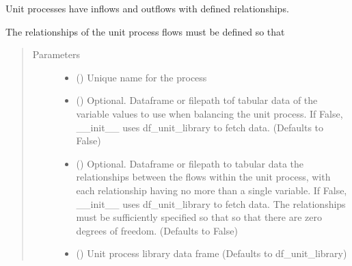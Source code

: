 \documentclass[a4paper,10pt,english]{sphinxmanual}
\begin{document}
\begin{fulllineitems}
\label{\detokenize{unit:unitprocess.UnitProcess}}
Unit processes have inflows and outflows with defined relationships.

The relationships of the unit process flows must be defined so that
\begin{quote}\begin{description}
\item[{Parameters}] \leavevmode\begin{itemize}
\item {} 
 () \textendash{} Unique name for the process

\item {} 
 () \textendash{} Optional. Dataframe or filepath tof
tabular data of the variable values to use when balancing the
unit process. If False, \_\_init\_\_ uses df\_unit\_library to fetch
data.
(Defaults to False)

\item {} 
 () \textendash{} Optional. Dataframe or filepath to
tabular data the relationships between the flows within the
unit process, with each relationship having no more than a
single variable. If False, \_\_init\_\_ uses df\_unit\_library to fetch
data. The relationships must be sufficiently specified so that
so that there are zero degrees of freedom.
(Defaults to False)

\item {} 
 () \textendash{} Unit process library data frame
(Defaults to df\_unit\_library)

\end{itemize}

\end{description}\end{quote}


\end{fulllineitems}
\end{document}
